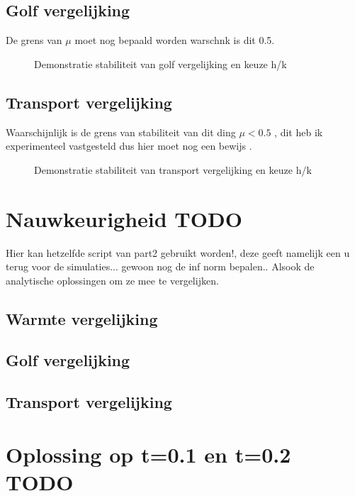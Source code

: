 \documentclass[11pt]{article} %
\begin{document}
	\subsection{Golf vergelijking}
	De grens van $\mu$ moet nog bepaald worden warschnk is dit 0.5.
	\begin{figure}[H]
		\centering
		\hfill
		\caption{Demonstratie stabiliteit van golf vergelijking en keuze h/k}
	\end{figure}
	\subsection{Transport vergelijking}
	Waarschijnlijk is de grens van stabiliteit van dit ding $\mu<0.5$ , dit heb ik experimenteel vastgesteld dus hier moet nog een bewijs .
	\begin{figure}[H]
		\centering
		\hfill
		\caption{Demonstratie stabiliteit van transport vergelijking en keuze h/k}
	\end{figure}
\clearpage
\section{Nauwkeurigheid TODO}
Hier kan hetzelfde script van part2 gebruikt worden!, deze geeft namelijk een u terug voor de simulaties... gewoon nog de inf norm bepalen.. Alsook de analytische oplossingen om ze mee te vergelijken.
	\subsection{Warmte vergelijking}
	\subsection{Golf vergelijking}
	\subsection{Transport vergelijking}
\clearpage
\section{Oplossing op t=0.1 en t=0.2 TODO}
\end{document}
